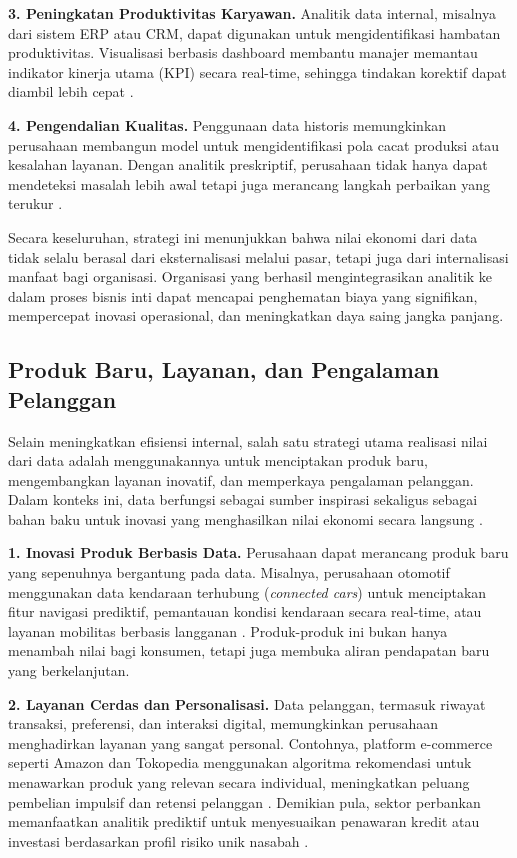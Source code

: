 \textbf{3. Peningkatan Produktivitas Karyawan.}  
Analitik data internal, misalnya dari sistem ERP atau CRM, dapat digunakan untuk mengidentifikasi hambatan produktivitas. Visualisasi berbasis dashboard membantu manajer memantau indikator kinerja utama (KPI) secara real-time, sehingga tindakan korektif dapat diambil lebih cepat \cite{few2006dashboard}.  

\textbf{4. Pengendalian Kualitas.}  
Penggunaan data historis memungkinkan perusahaan membangun model untuk mengidentifikasi pola cacat produksi atau kesalahan layanan. Dengan analitik preskriptif, perusahaan tidak hanya dapat mendeteksi masalah lebih awal tetapi juga merancang langkah perbaikan yang terukur \cite{lee2015industry}.

Secara keseluruhan, strategi ini menunjukkan bahwa nilai ekonomi dari data tidak selalu berasal dari eksternalisasi melalui pasar, tetapi juga dari internalisasi manfaat bagi organisasi. Organisasi yang berhasil mengintegrasikan analitik ke dalam proses bisnis inti dapat mencapai penghematan biaya yang signifikan, mempercepat inovasi operasional, dan meningkatkan daya saing jangka panjang.

\subsection{Produk Baru, Layanan, dan Pengalaman Pelanggan}

Selain meningkatkan efisiensi internal, salah satu strategi utama realisasi nilai dari data adalah menggunakannya untuk menciptakan produk baru, mengembangkan layanan inovatif, dan memperkaya pengalaman pelanggan. Dalam konteks ini, data berfungsi sebagai sumber inspirasi sekaligus sebagai bahan baku untuk inovasi yang menghasilkan nilai ekonomi secara langsung \cite{chen2012, mcafee2012}.

\textbf{1. Inovasi Produk Berbasis Data.}  
Perusahaan dapat merancang produk baru yang sepenuhnya bergantung pada data. Misalnya, perusahaan otomotif menggunakan data kendaraan terhubung (\textit{connected cars}) untuk menciptakan fitur navigasi prediktif, pemantauan kondisi kendaraan secara real-time, atau layanan mobilitas berbasis langganan \cite{zheng2016}. Produk-produk ini bukan hanya menambah nilai bagi konsumen, tetapi juga membuka aliran pendapatan baru yang berkelanjutan.

\textbf{2. Layanan Cerdas dan Personalisasi.}  
Data pelanggan, termasuk riwayat transaksi, preferensi, dan interaksi digital, memungkinkan perusahaan menghadirkan layanan yang sangat personal. Contohnya, platform e-commerce seperti Amazon dan Tokopedia menggunakan algoritma rekomendasi untuk menawarkan produk yang relevan secara individual, meningkatkan peluang pembelian impulsif dan retensi pelanggan \cite{sun2019}. Demikian pula, sektor perbankan memanfaatkan analitik prediktif untuk menyesuaikan penawaran kredit atau investasi berdasarkan profil risiko unik nasabah \cite{goyal2022}.

